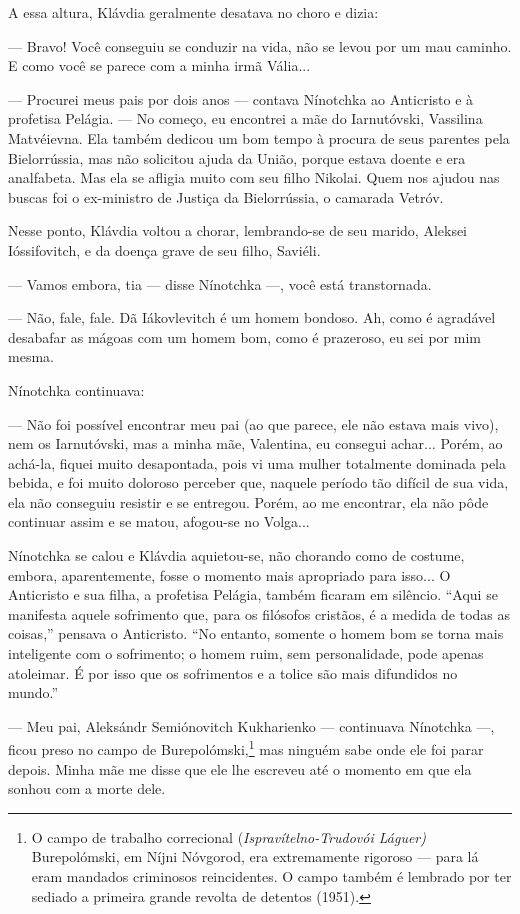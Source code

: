 A essa altura, Klávdia geralmente desatava no choro e dizia:

--- Bravo! Você conseguiu se conduzir na vida, não se levou por um mau
caminho. E como você se parece com a minha irmã Vália...

--- Procurei meus pais por dois anos --- contava Nínotchka ao Anticristo
e à profetisa Pelágia. --- No começo, eu encontrei a mãe do Iarnutóvski,
Vassilina Matvéievna. Ela também dedicou um bom tempo à procura de seus
parentes pela Bielorrússia, mas não solicitou ajuda da União, porque
estava doente e era analfabeta. Mas ela se afligia muito com seu filho
Nikolai. Quem nos ajudou nas buscas foi o ex-ministro de Justiça da
Bielorrússia, o camarada Vetróv.

Nesse ponto, Klávdia voltou a chorar, lembrando-se de seu marido,
Aleksei Ióssifovitch, e da doença grave de seu filho, Saviéli.

--- Vamos embora, tia --- disse Nínotchka ---, você está transtornada.

--- Não, fale, fale. Dã Iákovlevitch é um homem bondoso. Ah, como é
agradável desabafar as mágoas com um homem bom, como é prazeroso, eu sei
por mim mesma.

Nínotchka continuava:

--- Não foi possível encontrar meu pai (ao que parece, ele não estava
mais vivo), nem os Iarnutóvski, mas a minha mãe, Valentina, eu consegui
achar... Porém, ao achá-la, fiquei muito desapontada, pois vi uma mulher
totalmente dominada pela bebida, e foi muito doloroso perceber que,
naquele período tão difícil de sua vida, ela não conseguiu resistir e se
entregou. Porém, ao me encontrar, ela não pôde continuar assim e se
matou, afogou-se no Volga...

Nínotchka se calou e Klávdia aquietou-se, não chorando como de costume,
embora, aparentemente, fosse o momento mais apropriado para isso... O
Anticristo e sua filha, a profetisa Pelágia, também ficaram em silêncio.
``Aqui se manifesta aquele sofrimento que, para os filósofos cristãos, é
a medida de todas as coisas,'' pensava o Anticristo. ``No entanto,
somente o homem bom se torna mais inteligente com o sofrimento; o homem
ruim, sem personalidade, pode apenas atoleimar. É por isso que os
sofrimentos e a tolice são mais difundidos no mundo.''

--- Meu pai, Aleksándr Semiónovitch Kukharienko --- continuava Nínotchka
---, ficou preso no campo de Burepolómski,\footnote{O campo de trabalho
  correcional (\emph{Ispravítelno-Trudovói Láguer)} Burepolómski, em
  Níjni Nóvgorod, era extremamente rigoroso --- para lá eram mandados
  criminosos reincidentes. O campo também é lembrado por ter sediado a
  primeira grande revolta de detentos (1951).} mas ninguém sabe onde ele
foi parar depois. Minha mãe me disse que ele lhe escreveu até o momento
em que ela sonhou com a morte dele.

